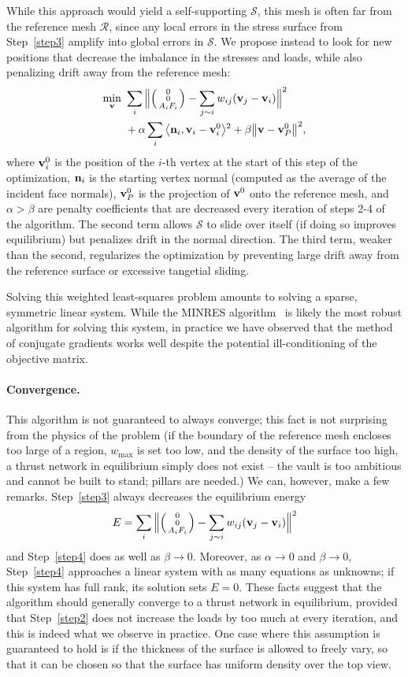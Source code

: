 \documentclass[annual]{acmsiggraph}
\makeatletter
\def\<{\mathchoice{\big\langle}{\langle}{\langle}{\langle}}
\def\>{\mathchoice{\big\rangle}{\rangle}{\rangle}{\rangle}}
\def\Forcevector{\Big(\mbox{\scriptsize
	\def\arraystretch{0.8}\begin{tabular}{@{\,}c@{\,}}
	0 \\ 0 \\ $A_i F_i$
	\end{tabular}}\Big)}
\def\SS{{\mathcal S}}
\def\RR{{\mathcal R}}
\makeatother
\begin{document}
While this approach would yield a self-supporting $\SS$, this mesh is
often far from the reference mesh $\RR$, since any local errors in the
stress surface from Step~\ref{step3} amplify into global errors in $\SS$. We propose
instead to look for new positions that decrease the imbalance in the
stresses and loads, while also penalizing drift away from the reference
mesh:
	\begin{align*}
	\min_{\vw}
	\ &
	\sum_i \Big\|
		\Forcevector -
		\sum_{j\sim i} w_{ij} (\vw_j - \vw_i)
		\Big\|^2
	\\ &
	+ \alpha \sum_i
		\<\nw_i, \vw_i - \vw^0_i \>^2
		+ \beta \big\|\vw - \vw^0_P\big\|^2,
\end{align*}
 where ${\mathbf v}^0_i$ is the position of the $i$-th vertex at the start of this
step of the optimization, ${\mathbf n}_i$ is the starting vertex normal (computed
as the average of the incident face normals), ${\mathbf v}^0_P$ is the projection
of ${\mathbf v}^0$ onto the reference mesh, and $\alpha > \beta$ are penalty
coefficients that are decreased every iteration of steps 2-4 of the
algorithm. The second term allows $\SS$ to slide over itself (if doing so
improves equilibrium) but penalizes drift in the normal direction. The
third term, weaker than the second, regularizes the optimization by
preventing large drift away from the reference surface or excessive
tangetial sliding.

Solving this weighted least-squares problem amounts to solving a sparse,
symmetric linear system. While the MINRES algorithm~\cite{paige75} is likely
the most robust algorithm for solving this system, in practice we have
observed that the method of conjugate gradients works well despite the
potential ill-conditioning of the objective matrix.

\paragraph{Convergence.}
This algorithm is not guaranteed to always converge; this fact is not surprising from the physics of the problem (if the boundary of the reference mesh encloses too large of a region, $w_{\max}$ is set too low, and the density of the surface too high, a thrust network in equilibrium simply does not exist -- the vault is too ambitious and cannot be built to stand; pillars are needed.) We can, however, make a few remarks. Step~\ref{step3} always decreases the equilibrium energy
	$$E=\sum_i \Big\| \Forcevector 
		- \sum_{j\sim i} w_{ij} (\vw_j - \vw_i)\Big\|^2$$
and Step~\ref{step4} does as well as $\beta \to 0$. Moreover, as $\alpha \to 0$ and $\beta \to 0$, Step~\ref{step4} approaches a linear system with as many equations as unknowns; if this system has full rank, its solution sets $E=0$. These facts suggest that the algorithm should generally converge to a thrust network in equilibrium, provided that Step~\ref{step2} does not increase the loads by too much at every iteration, and this is indeed what we observe in practice. One case where this assumption is guaranteed to hold is if the thickness of the surface is allowed to freely vary, so that it can be chosen so that the surface has uniform density over the top view.
\end{document}
